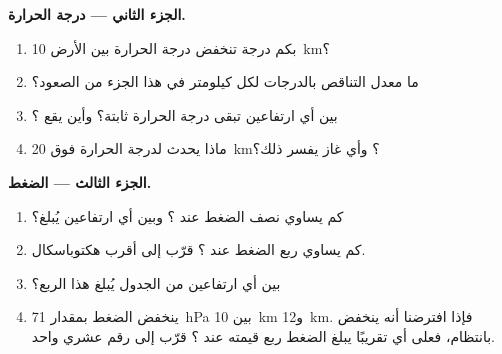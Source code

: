 \begin{problem}
\noindent\textbf{الجزء الثاني --- درجة الحرارة.}\par\nopagebreak
\begin{enumerate}[resume, beginpenalty=10000]
  \item بكم درجة تنخفض درجة الحرارة بين الأرض 
        \qty{10}{km}؟
  \item ما معدل التناقص بالدرجات لكل كيلومتر في هذا الجزء من
        الصعود؟
  \item بين أي ارتفاعين تبقى درجة الحرارة ثابتة؟
        وأين يقع ؟
  \item ماذا يحدث لدرجة الحرارة فوق \qty{20}{km}؟ وأي غاز
        يفسر ذلك؟
\end{enumerate}

\noindent\textbf{الجزء الثالث --- الضغط.}\par\nopagebreak
\begin{enumerate}[resume, beginpenalty=10000]
  \item كم يساوي نصف الضغط عند ؟ وبين أي
        ارتفاعين يُبلغ؟
  \item كم يساوي ربع الضغط عند ؟ قرّب إلى أقرب
        هكتوباسكال.
  \item بين أي ارتفاعين من الجدول يُبلغ هذا الربع؟
  \item ينخفض الضغط بمقدار \qty{71}{hPa} بين \qty{10}{km}
        و\qty{12}{km}. فإذا افترضنا أنه ينخفض بانتظام، فعلى أي  تقريبًا
        يبلغ الضغط ربع قيمته عند ؟ قرّب إلى رقم
        عشري واحد.
\end{enumerate}
\end{problem}
